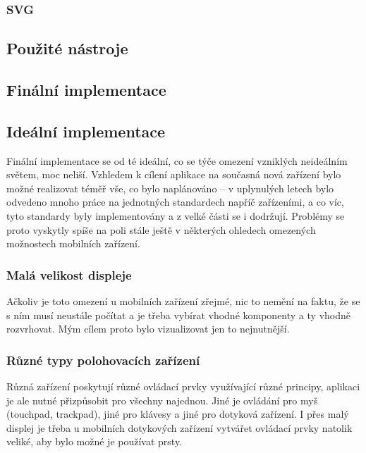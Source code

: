 \subsubsection{SVG}

\subsubsection*{}

\subsection{Použité nástroje}


\subsection{Finální implementace}

\subsection{Ideální implementace}
Finální implementace se od té ideální, co se týče omezení vzniklých neideálním světem, moc neliší. Vzhledem k cílení aplikace na současná nová zařízení bylo možné realizovat téměř vše, co bylo naplánováno -- v uplynulých letech bylo odvedeno mnoho práce na jednotných standardech napříč zařízeními, a co víc, tyto standardy byly implementovány a z velké části se i dodržují. Problémy se proto vyskytly spíše na poli stále ještě v některých ohledech omezených možnostech mobilních zařízení.

\subsubsection{Malá velikost displeje}
Ačkoliv je toto omezení u mobilních zařízení zřejmé, nic to nemění na faktu, že se s ním musí neustále počítat a je třeba vybírat vhodné komponenty a ty vhodně rozvrhovat. Mým cílem proto bylo vizualizovat jen to nejnutnější.

\subsubsection{Různé typy polohovacích zařízení}
Různá zařízení poskytují různé ovládací prvky využívající různé principy, aplikaci je ale nutné přizpůsobit pro všechny najednou. Jiné je ovládání pro myš (touchpad, trackpad), jiné pro klávesy a jiné pro dotyková zařízení. I přes malý displej je třeba u mobilních dotykových zařízení vytvářet ovládací prvky natolik veliké, aby bylo možné je používat prsty.

